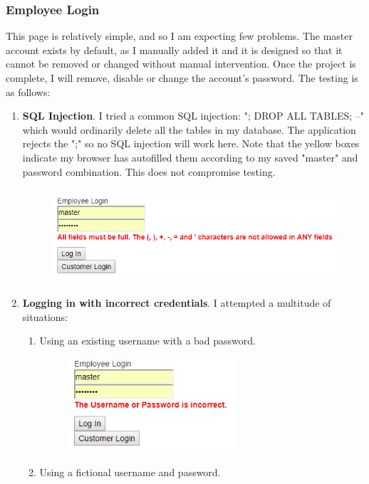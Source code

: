 ﻿\documentclass{article}
\begin{document}
    \subsubsection{Employee Login}
    This page is relatively simple, and so I am expecting few problems.
    The master account exists by default, as I manually added it and it is designed so that it cannot be removed or changed without manual intervention.
    Once the project is complete, I will remove, disable or change the account's password.
    The testing is as follows:
    \begin{enumerate}
        \item \textbf{SQL Injection}.
        I tried a common SQL injection: "; DROP ALL TABLES; --" which would ordinarily delete all the tables in my database.
        The application rejects the ";" so no SQL injection will work here.
        Note that the yellow boxes indicate my browser has autofilled them according to my saved "master" and password combination.
        This does not compromise testing.
        \begin{figure}[h]
            \includegraphics[height=3.5cm]{testing/empLogin1.png}
            \centering
        \end{figure}
        \item \textbf{Logging in with incorrect credentials}.
        I attempted a multitude of situations:
        \begin{enumerate}
            \item Using an existing username with a bad password.
            \begin{figure}[H]
                \includegraphics[height=3.5cm]{testing/empLogin2.png}
                \centering
            \end{figure}
            \item Using a fictional username and password.

\end{enumerate}
\end{enumerate}
\end{document}

